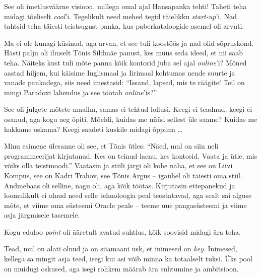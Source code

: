 
See oli imetlusväärne visioon, millega omal ajal Hansapanka 
tehti! Taheti teha midagi tõeliselt \emph{cool}'i. Tegelikult need mehed tegid täielikku \emph{start-up}'i. 
Nad tahtsid teha täiesti teistsugust panka, kus paberkataloogide asemel oli 
arvuti. 


Ma ei ole kunagi küsinud, aga arvan, et see tuli koostöös ja nad olid sõpruskond. 
Hästi palju oli ilmselt Tõnis Sildmäe panust, kes
müüs seda ideed, et nii saab teha. Näiteks kust tuli mõte panna kõik kontorid juba sel ajal \emph{online}'i? 
Mõned aastad hiljem, kui käisime Inglismaal ja Iirimaal kohtumas nende 
suurte ja vanade pankadega, siis need imestasid: \enquote{Issand, lapsed, mis 
te räägite! Teil on mingi Paradoxi lahendus ja see töötab \emph{online}'is?}

See oli julgete mõtete maailm, samas ei tehtud 
lollusi. Keegi ei teadnud, keegi ei osanud, aga kogu aeg õpiti. Mõeldi, 
kuidas me nüüd sellest üle saame? Kuidas me hakkame oskama? Keegi saadeti
kuskile midagi õppima \dots 

Minu esimene ülesanne oli see, et 
Tõnis ütles: \enquote{Näed, mul on siin neli 
programmeerijat kirjutanud. Kes on teinud laenu, kes kontosid. Vaata 
ja ütle, mis võiks olla teistmoodi.} Vaatasin ja stiili 
järgi oli kohe näha, et see on Liivi Kompus, see on Kadri Trahov, see Tõnis 
Argus -- igaühel oli täiesti oma stiil. Andmebaas oli selline, nagu oli, aga kõik
töötas. Kirjutasin ettepanekud ja loomulikult ei olnud need 
selle tehnoloogia peal teostatavad, aga sealt sai alguse mõte, et viime oma 
süsteemi Oracle peale -- teeme uue pangasüsteemi ja viime asja järgmisele 
tasemele.

Kogu eduloo \emph{point} oli ääretult avatud 
suhtlus, kõik soovisid midagi ära teha. 


Tead, mul on alati olnud ja on siiamaani usk, et inimesed on \emph{key}. Inimesed, kellega sa 
mingit asja teed, isegi kui asi võib minna ka totaalselt 
tuksi. Üks pool on muidugi oskused, aga isegi rohkem 
määrab ära suhtumine ja ambitsioon. 


